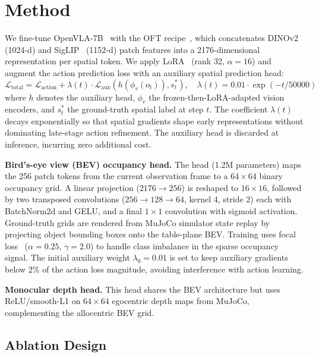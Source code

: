 
\section{Method}

We fine-tune OpenVLA-7B~\cite{kim2024openvla} with the OFT recipe~\cite{kim2025oft}, which concatenates DINOv2~\cite{oquab2024dinov2} (1024-d) and SigLIP~\cite{zhai2023siglip} (1152-d) patch features into a 2176-dimensional representation per spatial token. We apply LoRA~\cite{hu2022lora} (rank 32, $\alpha{=}16$) and augment the action prediction loss with an auxiliary spatial prediction head:
\begin{equation}
\mathcal{L}_\text{total} = \mathcal{L}_\text{action} + \lambda(t) \cdot \mathcal{L}_\text{aux}(h(\phi_v(o_t)), s_t^*),
\quad \lambda(t) = 0.01 \cdot \exp(-t / 50000)
\end{equation}
where $h$ denotes the auxiliary head, $\phi_v$ the frozen-then-LoRA-adapted vision encoders, and $s_t^*$ the ground-truth spatial label at step $t$. The coefficient $\lambda(t)$ decays exponentially so that spatial gradients shape early representations without dominating late-stage action refinement. The auxiliary head is discarded at inference, incurring zero additional cost.

\textbf{Bird's-eye view (BEV) occupancy head.} The head (1.2M parameters) maps the 256 patch tokens from the current observation frame to a $64{\times}64$ binary occupancy grid. A linear projection ($2176{\to}256$) is reshaped to $16{\times}16$, followed by two transposed convolutions ($256{\to}128{\to}64$, kernel 4, stride 2) each with BatchNorm2d and GELU, and a final $1{\times}1$ convolution with sigmoid activation. Ground-truth grids are rendered from MuJoCo simulator state replay by projecting object bounding boxes onto the table-plane BEV. Training uses focal loss~\cite{lin2017focal} ($\alpha{=}0.25$, $\gamma{=}2.0$) to handle class imbalance in the sparse occupancy signal. The initial auxiliary weight $\lambda_0{=}0.01$ is set to keep auxiliary gradients below 2\% of the action loss magnitude, avoiding interference with action learning.

\textbf{Monocular depth head.} This head shares the BEV architecture but uses ReLU/smooth-L1 on $64{\times}64$ egocentric depth maps from MuJoCo, complementing the allocentric BEV grid.

\subsection{Ablation Design}
\label{sec:ablation}

